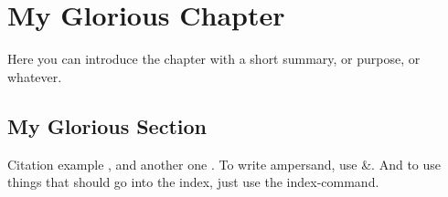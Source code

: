 \chapter{My Glorious Chapter}

Here you can introduce the chapter with a short summary, or purpose, or
whatever.

\section{My Glorious Section}

Citation example \cite[p.43]{TagToUseInLatexDocs}, and another one
\cite{RealDonaldKnuth}. To write ampersand, use
\&{}. And to use things that should go into the index, just use
the index-command.
